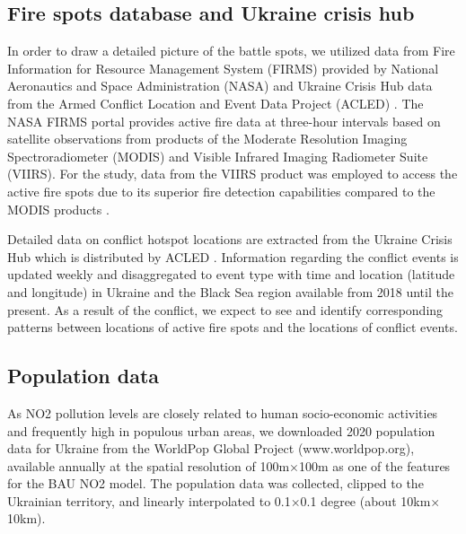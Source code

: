 \subsection{Fire spots database and Ukraine crisis hub}
In order to draw a detailed picture of the battle spots, we utilized data from Fire Information for Resource Management System (FIRMS) provided by National Aeronautics and Space Administration (NASA) and Ukraine Crisis Hub data from the Armed Conflict Location and Event Data Project (ACLED) \citep{raleigh2010introducing}. The NASA FIRMS portal provides active fire data at three-hour intervals based on satellite observations from products of the Moderate Resolution Imaging Spectroradiometer (MODIS) and Visible Infrared Imaging Radiometer Suite (VIIRS). For the study, data from the VIIRS product was employed to access the active fire spots due to its superior fire detection capabilities compared to the MODIS products \citep{csiszar2014active,schroeder2014new}. \par

Detailed data on conflict hotspot locations are extracted from the Ukraine Crisis Hub which is distributed by ACLED \citep{raleigh2010introducing}. Information regarding the conflict events is updated weekly and disaggregated to event type with time and location (latitude and longitude) in Ukraine and the Black Sea region available from 2018 until the present. As a result of the conflict, we expect to see and identify corresponding patterns between locations of active fire spots and the locations of conflict events. \par
\subsection{Population data}
As NO2 pollution levels are closely related to human socio-economic activities and frequently high in populous urban areas, we downloaded 2020 population data for Ukraine from the WorldPop Global Project (www.worldpop.org), available annually at the spatial resolution of 100m$\times$100m as one of the features for the BAU NO2 model. The population data was collected, clipped to the Ukrainian territory, and linearly interpolated to 0.1$\times$0.1 degree (about 10km$\times$10km).\par
